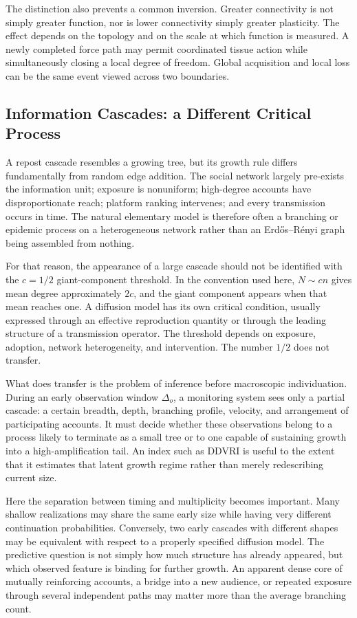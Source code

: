 \documentclass[11pt]{article}
\begin{document}
The distinction also prevents a common inversion. Greater connectivity is not simply greater function, nor is lower connectivity simply greater plasticity. The effect depends on the topology and on the scale at which function is measured. A newly completed force path may permit coordinated tissue action while simultaneously closing a local degree of freedom. Global acquisition and local loss can be the same event viewed across two boundaries.

\subsection{Information Cascades: a Different Critical Process}

A repost cascade resembles a growing tree, but its growth rule differs fundamentally from random edge addition. The social network largely pre-exists the information unit; exposure is nonuniform; high-degree accounts have disproportionate reach; platform ranking intervenes; and every transmission occurs in time. The natural elementary model is therefore often a branching or epidemic process on a heterogeneous network rather than an Erd\H{o}s--R\'enyi graph being assembled from nothing.

For that reason, the appearance of a large cascade should not be identified with the $c=1/2$ giant-component threshold. In the convention used here, $N\sim cn$ gives mean degree approximately $2c$, and the giant component appears when that mean reaches one. A diffusion model has its own critical condition, usually expressed through an effective reproduction quantity or through the leading structure of a transmission operator. The threshold depends on exposure, adoption, network heterogeneity, and intervention. The number $1/2$ does not transfer.

What does transfer is the problem of inference before macroscopic individuation. During an early observation window $\Delta_o$, a monitoring system sees only a partial cascade: a certain breadth, depth, branching profile, velocity, and arrangement of participating accounts. It must decide whether these observations belong to a process likely to terminate as a small tree or to one capable of sustaining growth into a high-amplification tail. An index such as DDVRI is useful to the extent that it estimates that latent growth regime rather than merely redescribing current size.

Here the separation between timing and multiplicity becomes important. Many shallow realizations may share the same early size while having very different continuation probabilities. Conversely, two early cascades with different shapes may be equivalent with respect to a properly specified diffusion model. The predictive question is not simply how much structure has already appeared, but which observed feature is binding for further growth. An apparent dense core of mutually reinforcing accounts, a bridge into a new audience, or repeated exposure through several independent paths may matter more than the average branching count.
\end{document}
